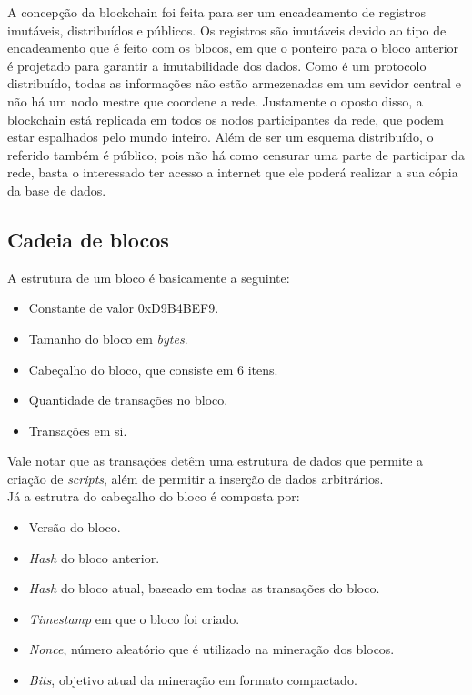 \documentclass{ufsctex/ufsctex}
\begin{document}
A concepção da blockchain foi feita para ser um encadeamento de registros
imutáveis, distribuídos e públicos. Os registros são imutáveis devido ao tipo de
encadeamento que é feito com os blocos, em que o ponteiro para o bloco anterior
é projetado para garantir a imutabilidade dos dados. Como é um protocolo
distribuído, todas as informações não estão armezenadas em um sevidor central e
não há um nodo mestre que coordene a rede. Justamente o oposto disso, a
blockchain está replicada em todos os nodos participantes da rede, que podem
estar espalhados pelo mundo inteiro. Além de ser um esquema distribuído, o
referido também é público, pois não há como censurar uma parte de participar da
rede, basta o interessado ter acesso a internet que ele poderá realizar a sua
cópia da base de dados.\cite{blockchain}

\subsection{Cadeia de blocos}

A estrutura de um bloco é basicamente a seguinte:
\begin{itemize}
	\item Constante de valor 0xD9B4BEF9.
	\item Tamanho do bloco em \textit{bytes}.
	\item Cabeçalho do bloco, que consiste em 6 itens.
	\item Quantidade de transações no bloco.
	\item Transações em si.
\end{itemize}

Vale notar que as transações detêm uma estrutura de dados que permite a criação
de \textit{scripts}, além de permitir a inserção de dados arbitrários. \\

Já a estrutra do cabeçalho do bloco é composta por:
\begin{itemize}
	\item Versão do bloco.
	\item \textit{Hash} do bloco anterior.
	\item \textit{Hash} do bloco atual, baseado em todas as transações do bloco.
	\item \textit{Timestamp} em que o bloco foi criado.
	\item \textit{Nonce}, número aleatório que é utilizado na mineração dos blocos.
	\item \textit{Bits}, objetivo atual da mineração em formato compactado.
\end{itemize}
\end{document}
